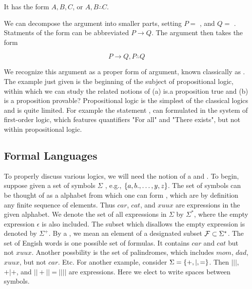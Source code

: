 It has the form $A, B, C$, or $A, B \therefore C$.

We can  decompose the argument into smaller parts, setting $P =$ , and $Q =$ .  Statments of the form  can be abbreviated $P \to Q$.  The argument then takes the form



\begin{equation}
\label{modusponens}
P \to Q, P \therefore Q
\end{equation}

We recognize this argument as a proper form of argument, known classically as .   The example just given is the beginning of the subject of propositional logic, within which we can study the related notions of (a) is.a proposition true and (b) is a proposition provable?  Propositional logic is the simplest of the classical logics and is quite limited.  For example the statement , can formulated in the system of first-order logic, which features quantifiers "For all" and "There exists", but not within propositional logic.



\subsection{Formal Languages}

To properly discuss various logics, we will need the notion of a  and . To begin, suppose given a set of symbols $\Sigma$ , e.g., $\{ a, b., \ldots, y, z \}$. The set of symbols can be thought of as a alphabet from which one can form , which are by definition  any finite sequence of elements.  Thus $car$, $cat$, and $xuux$ are expressions in the given alphabet.  We denote the set of all expressions in $\Sigma$ by $\Sigma^*$, where the empty expression $\epsilon$ is also included.  The subset which disallows the empty expression is denoted by $\Sigma^+$.  By a , we mean an element of a designated subset $\mathcal{F} \subset \Sigma^*$.  The set of Engish words is one possible set of formulas.  It contains $car$ and $cat$ but not $xuux$.  Another possbility is the set of palindromes, which includes $mom$, $dad$, $xuux$, but not $car$.  Etc.  For another example, consider $\Sigma = \{ +, |, = \}$.  Then $|||$, $+ | +$, and $|| + || = ||||$ are expressions.  Here we elect to write spaces between symbols.

